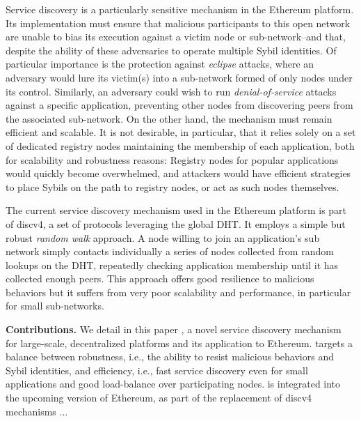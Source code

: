Service discovery is a particularly sensitive mechanism in the Ethereum platform.
Its implementation must ensure that malicious participants to this open network are unable to bias its execution against a victim node or sub-network--and that, despite the ability of these adversaries to operate multiple Sybil identities.
Of particular importance is the protection against \emph{eclipse} attacks, where an adversary would lure its victim(s) into a sub-network formed of only nodes under its control. %
Similarly, an adversary could wish to run \emph{denial-of-service} attacks against a specific application, preventing other nodes from discovering peers from the associated sub-network.
On the other hand, the mechanism must remain efficient and scalable.
It is not desirable, in particular, that it relies solely on a set of dedicated registry nodes maintaining the membership of each application, both for scalability and robustness reasons: Registry nodes for popular applications would quickly become overwhelmed, and attackers would have efficient strategies to place Sybils on the path to registry nodes, or act as such nodes themselves.

The current service discovery mechanism used in the Ethereum platform is part of discv4, a set of protocols leveraging the global DHT.
It employs a simple but robust \emph{random walk} approach.
A node willing to join an application's sub network simply contacts individually a series of nodes collected from random lookups on the DHT, repeatedly checking application membership until it has collected enough peers. %
This approach offers good resilience to malicious behaviors
but it suffers from very poor scalability and performance, in particular for small sub-networks.

\smallskip
\noindent
\textbf{Contributions.}
%
We detail in this paper \sysname, a novel service discovery mechanism for large-scale, decentralized platforms and its application to Ethereum.
\sysname targets a balance between robustness, i.e., the ability to resist malicious behaviors and Sybil identities, and efficiency, i.e., fast service discovery even for small applications and good load-balance over participating nodes.
\sysname is integrated into the upcoming version of Ethereum, as part of the replacement of discv4 mechanisms ... 

